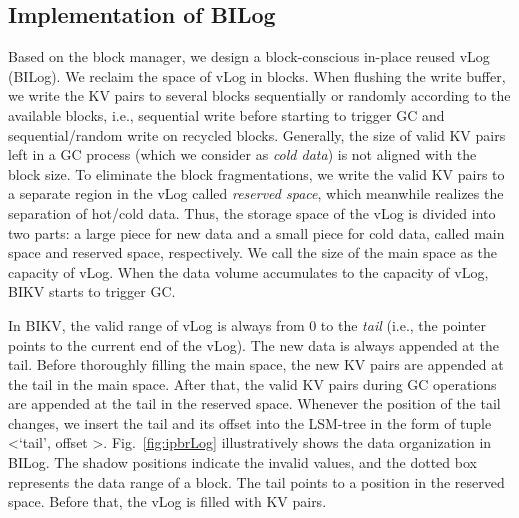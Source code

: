 \documentclass[sigconf]{acmart}
\begin{document}
\subsection{Implementation of BILog} \label{ss2}
Based on the block manager, we design a block-conscious in-place reused vLog (BILog). We reclaim the space of vLog in blocks. When flushing the write buffer, we write the KV pairs to several blocks sequentially or randomly according to the available blocks, i.e., sequential write before starting to trigger GC and sequential/random write on recycled blocks. Generally, the size of valid KV pairs left in a GC process (which we consider as \textit{cold data}) is not aligned with the block size. To eliminate the block fragmentations, we write the valid KV pairs to a separate region in the vLog called \textit{reserved space}, which meanwhile realizes the separation of hot/cold data. Thus, the storage space of the vLog is divided into two parts: a large piece for new data and a small piece for cold data, called main space and reserved space, respectively. We call the size of the main space as the capacity of vLog. When the data volume accumulates to the capacity of vLog, BIKV starts to trigger GC.

In BIKV, the valid range of vLog is always from 0 to the \textit{tail} (i.e., the pointer points to the current end of the vLog). The new data is always appended at the tail. Before thoroughly filling the main space, the new KV pairs are appended at the tail in the main space. After that, the valid KV pairs during GC operations are appended at the tail in the reserved space. Whenever the position of the tail changes, we insert the tail and its offset into the LSM-tree in the form of tuple \textless `tail', offset \textgreater. Fig.~\ref{fig:ipbrLog} illustratively shows the data organization in BILog. The shadow positions indicate the invalid values, and the dotted box represents the data range of a block. The tail points to a position in the reserved space. Before that, the vLog is filled with KV pairs.  
\end{document}
